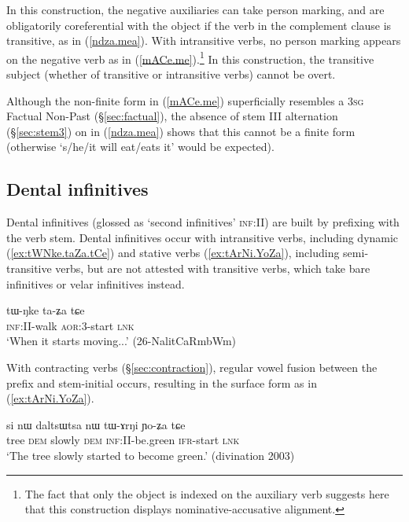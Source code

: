 In this construction, the negative auxiliaries can take person marking, and are obligatorily coreferential with the object if the verb in the complement clause is transitive, as in (\ref{ndza.mea}). With intransitive verbs, no person marking appears on the negative verb as in (\ref{mACe.me}).\footnote{The fact that only the object is indexed on the auxiliary verb suggests here that this construction displays nominative-accusative alignment.  }
In this construction, the transitive subject (whether of transitive or intransitive verbs) cannot be overt.

Although the non-finite form  in  (\ref{mACe.me}) superficially resembles a \textsc{3sg} Factual Non-Past (§\ref{sec:factual}), the absence of stem III alternation (§\ref{sec:stem3}) on  in (\ref{ndza.mea}) shows that this cannot be a finite form (otherwise  `s/he/it will eat/eats it' would be expected).

\subsection{Dental infinitives} \label{sec:dental.inf}
Dental infinitives (glossed as `second infinitives' \textsc{inf}:II) are built by prefixing  with the verb stem. Dental infinitives occur with intransitive verbs, including dynamic (\ref{ex:tWNke.taZa.tCe}) and stative verbs (\ref{ex:tArNi.YoZa}), including semi-transitive verbs, but are not attested with transitive verbs, which take bare infinitives or velar infinitives instead.

\begin{exe} 
\ex \label{ex:tWNke.taZa.tCe}
\gll tɯ-ŋke ta-ʑa tɕe \\
\textsc{inf}:\textsc{II}-walk \textsc{aor}:3\flobv{}-start  \textsc{lnk} \\
\glt `When it starts moving...' (26-NalitCaRmbWm) 
\end{exe} 

 
With contracting verbs (§\ref{sec:contraction}), regular vowel fusion between the  prefix and stem-initial   occurs, resulting in the surface form  as in (\ref{ex:tArNi.YoZa}).

\begin{exe} 
\ex \label{ex:tArNi.YoZa}
\gll si nɯ daltsɯtsa nɯ tɯ-ɤrŋi ɲo-ʑa tɕe \\
tree \textsc{dem} slowly \textsc{dem} \textsc{inf}:II-be.green \textsc{ifr}-start \textsc{lnk} \\
\glt `The tree slowly started to become green.' (divination 2003)
\end{exe} 

